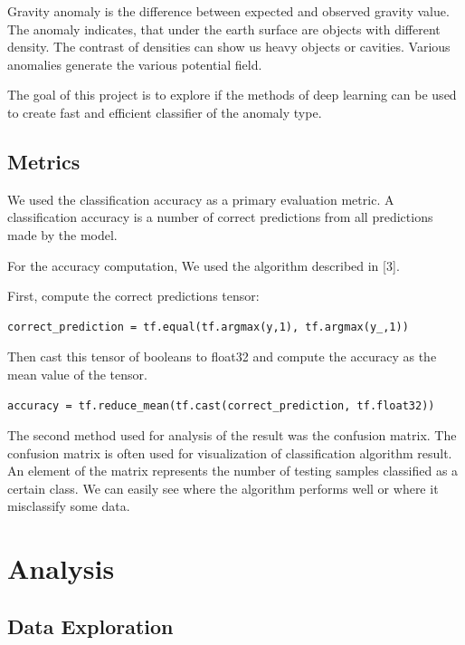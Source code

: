 \documentclass{article}
\begin{document}
Gravity anomaly is the difference between expected and observed gravity
value. The anomaly indicates, that under the earth surface are objects
with different density. The contrast of densities can show us heavy
objects or cavities. Various anomalies generate the various potential
field.

The goal of this project is to explore if the methods of deep learning
can be used to create fast and efficient classifier of the anomaly
type.

\subsection{Metrics}

We used the classification accuracy as a primary evaluation metric. A
classification accuracy is a number of correct predictions from all
predictions made by the model.

For the accuracy computation, We used the algorithm described in
{[}3{]}.

First, compute the correct predictions tensor:

\begin{verbatim}
correct_prediction = tf.equal(tf.argmax(y,1), tf.argmax(y_,1))
\end{verbatim}

Then cast this tensor of booleans to float32 and compute the accuracy as
the mean value of the tensor.

\begin{verbatim}
accuracy = tf.reduce_mean(tf.cast(correct_prediction, tf.float32))
\end{verbatim}

The second method used for analysis of the result was the confusion
matrix. The confusion matrix is often used for visualization of
classification algorithm result. An element of the matrix represents the
number of testing samples classified as a certain class. We can easily
see where the algorithm performs well or where it misclassify some data.

\section{Analysis}\label{ii.-analysis}

\subsection{Data Exploration}\label{data-exploration}
\end{document}
